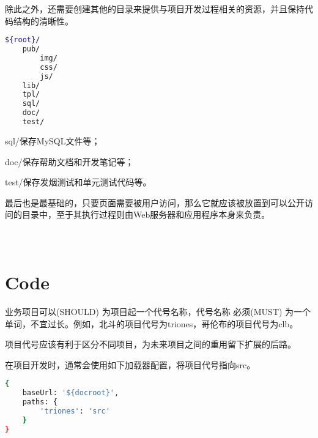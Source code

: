 除此之外，还需要创建其他的目录来提供与项目开发过程相关的资源，并且保持代码结构的清晰性。


\begin{lstlisting}[language=bash]
${root}/
    pub/
        img/
        css/
        js/
    lib/
    tpl/
    sql/
    doc/
    test/
\end{lstlisting}


\begin{compactitem}
\item sql/保存MySQL文件等；
\item doc/保存帮助文档和开发笔记等；
\item test/保存发烟测试和单元测试代码等。
\end{compactitem}

最后也是最基础的，只要页面需要被用户访问，那么它就应该被放置到可以公开访问的目录中，至于其执行过程则由Web服务器和应用程序本身来负责。


\begin{lstlisting}[language=bash]

\end{lstlisting}




\begin{lstlisting}[language=bash]

\end{lstlisting}




\begin{lstlisting}[language=bash]

\end{lstlisting}





\section{Code}

业务项目可以(SHOULD) 为项目起一个代号名称，代号名称 必须(MUST) 为一个单词，不宜过长。例如，北斗的项目代号为triones，哥伦布的项目代号为clb。

项目代号应该有利于区分不同项目，为未来项目之间的重用留下扩展的后路。


在项目开发时，通常会使用如下加载器配置，将项目代号指向src。


\begin{lstlisting}[language=bash]
{
    baseUrl: '${docroot}',
    paths: {
        'triones': 'src'
    }
}
\end{lstlisting}

